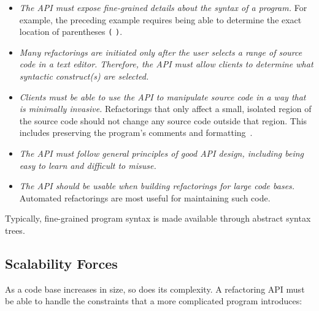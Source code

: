 \documentclass[prodmode]{acmlarge}
\newcommand{\ttt}[1]{\texttt{#1}}
\begin{document}
\begin{itemize}

    \item \textit{The API must expose fine-grained details about the syntax of a program.}
For example, the preceding example requires being able to determine the
exact location of parentheses \ttt{(} \ttt{)}.

\item \textit{Many refactorings are initiated only after the user selects a range of
source code in a text editor.  Therefore, the API must allow clients to
        determine what syntactic construct(s) are selected.}

    \item \textit{Clients must be able to use the API to manipulate source code in a way
        that is minimally invasive.} Refactorings that only affect a small, isolated
region of the source code should not change any source code outside that
region.  This includes preserving the program's comments and
formatting~\cite{sommerlad08retaining}.

\item \textit{The API must follow general principles of good API design, including
    being easy to learn and difficult to misuse.}

\item \textit{The API should be usable when building refactorings for large code bases.}
Automated refactorings are most useful for maintaining such code.

\end{itemize}

Typically, fine-grained program syntax is made available through 
abstract syntax trees.

\subsection{Scalability Forces}

As a code base increases in size, so does its complexity. A refactoring API 
must be able to handle the constraints that a more complicated program 
introduces:
\end{document}
